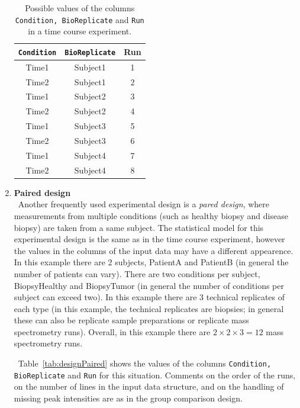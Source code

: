 \documentclass[11pt]{article}
\def\tabref#1{Table~\ref{tab:#1}}
\begin{document}
\begin{enumerate}
\begin{table}[h!]
\small
\begin{center}
\begin{tabular}{|c|c|c|}
  \hline
{\tt Condition} &   {\tt BioReplicate}&	 	Run \\ \hline \hline
Time1	&		Subject1	&		1\\ \hline
Time2	&		Subject1	&		2\\ \hline
Time1	&		Subject2	&		3\\ \hline
Time2	&		Subject2	&		4\\ \hline
Time1	&		Subject3	&		5\\	\hline
Time2	&		Subject3	&		6\\	\hline
Time1	&		Subject4	&		7\\	\hline
Time2	&		Subject4	&		8\\ \hline
\end{tabular}
\caption{Possible values of the columns {\tt Condition, BioReplicate} and {\tt Run} in a time course experiment.
\label{tab:designTimeCourse}}
\end{center}
\end{table}


\newpage
\vspace{0.3cm}
\item {\bf Paired design}\\\
Another frequently used experimental design is a {\it pared design}, where measurements from multiple conditions (such as healthy biopsy and disease biopsy) are taken from a same subject. The statistical model for this experimental design is the same as in the time course experiment, however the values in the columns of the input data may have a different appearence. In this example there are 2 subjects, PatientA and PatientB (in general the number of patients can vary). There are two conditions per subject, BiopsyHealthy and BiopsyTumor (in general the number of conditions per subject can exceed two). In this example there are 3 technical replicates of each type (in this example, the technical replicates are biopsies; in general these can also be replicate sample preparations or replicate mass spectrometry runs). Overall, in this example there are $2  \times 2 \times 3 = 12$ mass spectrometry runs. 

~\tabref{designPaired} shows the values of the columns {\tt Condition, BioReplicate} and {\tt Run} for this situation. Comments on the order of the runs, on the number of lines in the input data structure, and on the handling of missing peak intensities are as in the group comparison design.


\end{enumerate}
\end{document}
